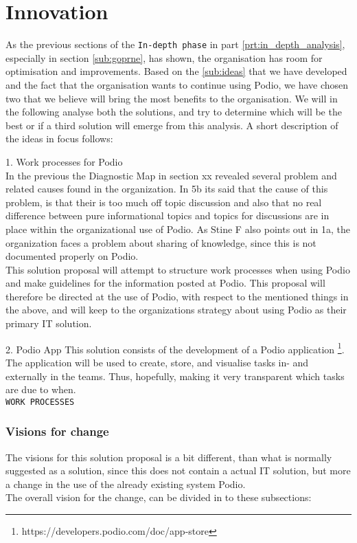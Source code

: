 \part{Innovation}
As the previous sections of the \texttt{In-depth phase} in part \ref{prt:in_depth_analysis},
especially in section \ref{sub:goprne}, has shown,
the organisation has room for optimisation and improvements. Based on the \ref{sub:ideas} that we
have developed and the fact that the organisation wants to continue using Podio, we have chosen two that we believe will bring the most benefits to the organisation.
We will in the following analyse both the solutions, and try to determine which will be the best or
if a third solution will emerge from this analysis. A short description of the ideas in focus
follows:


1. Work processes for Podio\\
In the previous the Diagnostic Map in section xx revealed several problem and related causes found in the organization. In 5b its said that the cause of this problem, is that their is too much off topic discussion and also that no real difference between pure informational topics and topics for discussions are in place within the organizational use of Podio. As Stine F also points out in 1a, the organization faces a problem about sharing of knowledge, since this is not documented properly on Podio.\\

This solution proposal will attempt to structure work processes when using Podio and make guidelines for the information posted at Podio. This proposal will therefore be directed at the use of Podio, with respect to the mentioned things in the above, and will keep to the organizations strategy about using Podio as their primary IT solution. 

2. Podio App
This solution consists of the development of a Podio application \footnote{https://developers.podio.com/doc/app-store}.
The application will be used to create, store, and visualise tasks in- and externally in the teams.
Thus, hopefully, making it very transparent which tasks are due to when.\\

\texttt{WORK PROCESSES}
\section{Visions for change}
The visions for this solution proposal is a bit different, than what is normally suggested as a solution, since this does not contain a actual IT solution, but more a change in the use of the already existing system Podio.\\
The overall vision for the change, can be divided in to these subsections:
